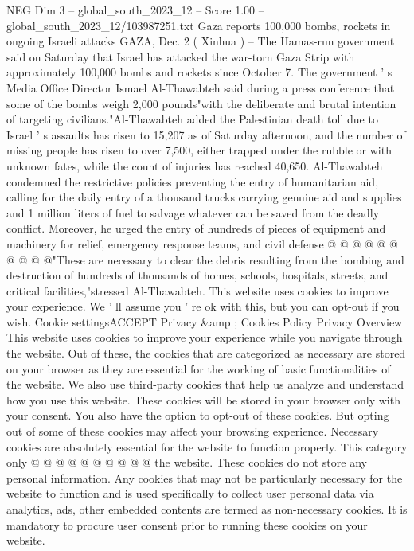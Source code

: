 \begin{textsample}{NEG Dim 3 – global\_south\_2023\_12 – Score 1.00 – global\_south\_2023\_12/103987251.txt}  \label{ex:f3_neg_002}
Gaza reports 100,000 bombs, rockets in ongoing Israeli attacks GAZA, Dec. 2 ( Xinhua ) -- The Hamas-run government said on Saturday that Israel has attacked the war-torn Gaza Strip with approximately 100,000 bombs and rockets since October 7.
The government ' s Media Office Director Ismael Al-Thawabteh said during a press conference that some of the bombs weigh 2,000 pounds"with the deliberate and brutal intention of targeting civilians."Al-Thawabteh added the Palestinian death toll due to Israel ' s assaults has risen to 15,207 as of Saturday afternoon, and the number of missing people has risen to over 7,500, either trapped under the rubble or with unknown fates, while the count of injuries has reached 40,650.
Al-Thawabteh condemned the restrictive policies preventing the entry of humanitarian aid, calling for the daily entry of a thousand trucks carrying genuine aid and supplies and 1 million liters of fuel to salvage whatever can be saved from the deadly conflict.
Moreover, he urged the entry of hundreds of pieces of equipment and machinery for relief, emergency response teams, and civil defense @ @ @ @ @ @ @ @ @ @"These are necessary to clear the debris resulting from the bombing and destruction of hundreds of thousands of homes, schools, hospitals, streets, and critical facilities,"stressed Al-Thawabteh.
This website uses cookies to improve your experience.
We ' ll assume you ' re ok with this, but you can opt-out if you wish.
Cookie settingsACCEPT Privacy \&amp ; Cookies Policy Privacy Overview This website uses cookies to improve your experience while you navigate through the website.
Out of these, the cookies that are categorized as necessary are stored on your browser as they are essential for the working of basic functionalities of the website.
We also use third-party cookies that help us analyze and understand how you use this website.
These cookies will be stored in your browser only with your consent.
You also have the option to opt-out of these cookies.
But opting out of some of these cookies may affect your browsing experience.
Necessary cookies are absolutely essential for the website to function properly.
This category only @ @ @ @ @ @ @ @ @ @ the website.
These cookies do not store any personal information.
Any cookies that may not be particularly necessary for the website to function and is used specifically to collect user personal data via analytics, ads, other embedded contents are termed as non-necessary cookies.
It is mandatory to procure user consent prior to running these cookies on your website.

\end{textsample}
